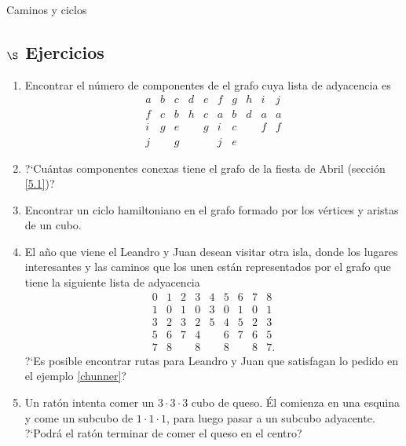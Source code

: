 \begin{section}{Caminos y ciclos}
\subsection*{\Large $\S$ Ejercicios}\label{ejercicios5.4}
\begin{enumerate}[1)]
\item Encontrar el número de componentes de el grafo cuya lista de adyacencia es
$$
\begin{matrix}
a&b&c&d&e&f&g&h&i&j\\ \hline
f&c&b&h&c&a&b&d&a&a\\
i&g&e&&g&i&c&&f&f\\
j&&g&&&j&e&&&
\end{matrix}
$$

\item ?`Cuántas componentes conexas tiene el grafo de la fiesta de Abril (sección \ref{5.1})?
\item Encontrar un ciclo hamiltoniano en el grafo formado por los vértices y aristas de un
cubo.
\item El año que viene el Leandro y Juan desean visitar otra isla, donde los lugares interesantes y las caminos que los unen están representados por el grafo que tiene la siguiente lista de adyacencia
$$
\begin{matrix}
0&1&2&3&4&5&6&7&8\\ \hline
1&0&1&0&3&0&1&0&1\\
3&2&3&2&5&4&5&2&3\\
5&6&7&4&&6&7&6&5\\
7&8&&8&&8&&8&7.
\end{matrix}
$$
?`Es posible encontrar rutas para Leandro y Juan que satisfagan lo pedido en el ejemplo \ref{chunner}?
\item Un ratón intenta comer un $3\cdot 3\cdot 3$ cubo de queso. Él comienza en una esquina y come un subcubo de $1\cdot 1\cdot 1$, para luego pasar a un subcubo  adyacente. ?`Podrá el ratón terminar de comer el queso en el centro?
\end{enumerate}

\end{section}



